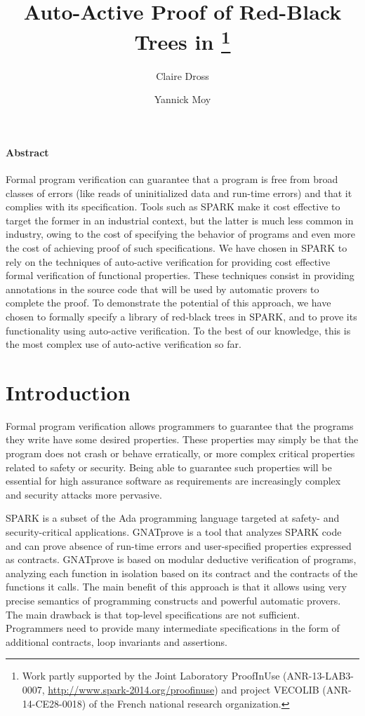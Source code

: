 \documentclass{llncs}
\title{Auto-Active Proof of Red-Black Trees in \spark\thanks{Work partly
supported by the Joint Laboratory ProofInUse (ANR-13-LAB3-0007,
\url{http://www.spark-2014.org/proofinuse}) and project VECOLIB
(ANR-14-CE28-0018) of the French national research organization.}}
\author{Claire Dross \and Yannick Moy}
\institute{AdaCore, F-75009 Paris}
\date{}
\newcommand{\spark}{SPARK\xspace}
\begin{document}
\sloppy
{}
\maketitle

\paragraph{Abstract}
Formal program verification can guarantee that a program is free from broad
classes of errors (like reads of uninitialized data and run-time errors) and
that it complies with its specification. Tools such as \spark make it cost
effective to target the former in an industrial context, but the latter is much
less common in industry, owing to the cost of specifying the behavior of
programs and even more the cost of achieving proof of such specifications. We
have chosen in \spark to rely on the techniques of auto-active verification for
providing cost effective formal verification of functional properties. These
techniques consist in providing annotations in the source code that will be
used by automatic provers to complete the proof. To demonstrate
the potential of this approach, we have chosen to formally specify a library
of red-black trees in \spark, and to prove its functionality using auto-active
verification. To the best of our knowledge, this is the most complex use of
auto-active verification so far.


\section{Introduction}

Formal program verification allows programmers to guarantee that the programs
they write have some desired properties. These properties may simply be that
the program does not crash or behave erratically, or more complex critical
properties related to safety or security. Being able to guarantee such
properties will be essential for high assurance software as requirements are
increasingly complex and security attacks more pervasive.

SPARK is a subset of the Ada programming language targeted at safety- and
security-critical applications. GNATprove is a tool that analyzes SPARK code
and can prove absence of run-time errors and user-specified properties
expressed as contracts. GNATprove is based on modular deductive verification of
programs, analyzing each function in isolation based on its contract and the
contracts of the functions it calls. The main benefit of this approach is that
it allows using very precise semantics of programming constructs and powerful
automatic provers. The main drawback is that top-level specifications are not
sufficient. Programmers need to provide many intermediate specifications in the
form of additional contracts, loop invariants and assertions.
\end{document}
